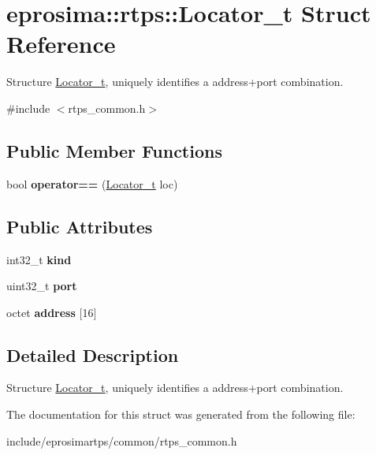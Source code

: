 \hypertarget{structeprosima_1_1rtps_1_1_locator__t}{\section{eprosima\-:\-:rtps\-:\-:\-Locator\-\_\-t \-Struct \-Reference}
\label{structeprosima_1_1rtps_1_1_locator__t}
}


\-Structure \hyperlink{structeprosima_1_1rtps_1_1_locator__t}{\-Locator\-\_\-t}, uniquely identifies a address+port combination.  




{\ttfamily \#include $<$rtps\-\_\-common.\-h$>$}

\subsection*{\-Public \-Member \-Functions}
\begin{DoxyCompactItemize}
\item 
\hypertarget{structeprosima_1_1rtps_1_1_locator__t_af51d777e1c1699a674660479ec34d733}{bool {\bfseries operator==} (\hyperlink{structeprosima_1_1rtps_1_1_locator__t}{\-Locator\-\_\-t} loc)}\label{structeprosima_1_1rtps_1_1_locator__t_af51d777e1c1699a674660479ec34d733}

\end{DoxyCompactItemize}
\subsection*{\-Public \-Attributes}
\begin{DoxyCompactItemize}
\item 
\hypertarget{structeprosima_1_1rtps_1_1_locator__t_abea2c5336c9ecf46cb3ef664c1bb184b}{int32\-\_\-t {\bfseries kind}}\label{structeprosima_1_1rtps_1_1_locator__t_abea2c5336c9ecf46cb3ef664c1bb184b}

\item 
\hypertarget{structeprosima_1_1rtps_1_1_locator__t_a755e0cb0e001dc7e4b9ed849dc6a9e31}{uint32\-\_\-t {\bfseries port}}\label{structeprosima_1_1rtps_1_1_locator__t_a755e0cb0e001dc7e4b9ed849dc6a9e31}

\item 
\hypertarget{structeprosima_1_1rtps_1_1_locator__t_a360f3d4c49d09c44041a6e1d53f91733}{octet {\bfseries address} \mbox{[}16\mbox{]}}\label{structeprosima_1_1rtps_1_1_locator__t_a360f3d4c49d09c44041a6e1d53f91733}

\end{DoxyCompactItemize}


\subsection{\-Detailed \-Description}
\-Structure \hyperlink{structeprosima_1_1rtps_1_1_locator__t}{\-Locator\-\_\-t}, uniquely identifies a address+port combination. 

\-The documentation for this struct was generated from the following file\-:\begin{DoxyCompactItemize}
\item 
include/eprosimartps/common/rtps\-\_\-common.\-h\end{DoxyCompactItemize}
